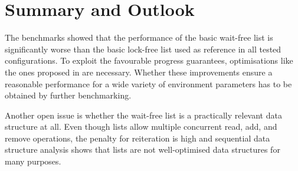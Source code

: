 \documentclass[a4paper, 12pt]{article}
\begin{document}
\section{Summary and Outlook}

The benchmarks showed that the performance of the basic wait-free list is significantly worse than the basic lock-free list used as reference in all tested configurations. To exploit the favourable progress guarantees, optimisations like the ones proposed in \cite{timnat12} are necessary. Whether these improvements ensure a reasonable performance for a wide variety of environment parameters has to be obtained by further benchmarking.

Another open issue is whether the wait-free list is a practically relevant data structure at all. Even though lists allow multiple concurrent read, add, and remove operations, the penalty for reiteration is high and sequential data structure analysis shows that lists are not well-optimised data structures for many purposes.

\sloppy
\printbibliography
\end{document}
